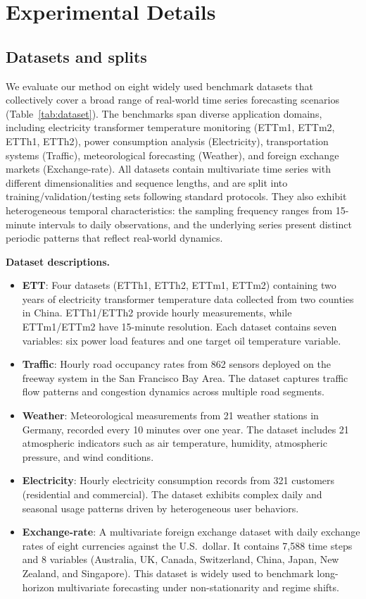 
\section{Experimental Details}
\label{appx:experiment_details}

\subsection{Datasets and splits}

We evaluate our method on eight widely used benchmark datasets that collectively cover a broad range of real-world time series forecasting scenarios (Table~\ref{tab:dataset}). The benchmarks span diverse application domains, including electricity transformer temperature monitoring (ETTm1, ETTm2, ETTh1, ETTh2), power consumption analysis (Electricity), transportation systems (Traffic), meteorological forecasting (Weather), and foreign exchange markets (Exchange-rate). All datasets contain multivariate time series with different dimensionalities and sequence lengths, and are split into training/validation/testing sets following standard protocols. They also exhibit heterogeneous temporal characteristics: the sampling frequency ranges from 15-minute intervals to daily observations, and the underlying series present distinct periodic patterns that reflect real-world dynamics.



\noindent\textbf{Dataset descriptions.}
\begin{itemize}[leftmargin=*]
\item \textbf{ETT}: Four datasets (ETTh1, ETTh2, ETTm1, ETTm2) containing two years of electricity transformer temperature data collected from two counties in China. ETTh1/ETTh2 provide hourly measurements, while ETTm1/ETTm2 have 15-minute resolution. Each dataset contains seven variables: six power load features and one target oil temperature variable.
  \item \textbf{Traffic}: Hourly road occupancy rates from 862 sensors deployed on the freeway system in the San Francisco Bay Area. The dataset captures traffic flow patterns and congestion dynamics across multiple road segments.
  \item \textbf{Weather}: Meteorological measurements from 21 weather stations in Germany, recorded every 10 minutes over one year. The dataset includes 21 atmospheric indicators such as air temperature, humidity, atmospheric pressure, and wind conditions.
  \item \textbf{Electricity}: Hourly electricity consumption records from 321 customers (residential and commercial). The dataset exhibits complex daily and seasonal usage patterns driven by heterogeneous user behaviors.
  \item \textbf{Exchange-rate}: A multivariate foreign exchange dataset with daily exchange rates of eight currencies against the U.S.\ dollar. It contains 7,588 time steps and 8 variables (Australia, UK, Canada, Switzerland, China, Japan, New Zealand, and Singapore). This dataset is widely used to benchmark long-horizon multivariate forecasting under non-stationarity and regime shifts.
\end{itemize}

